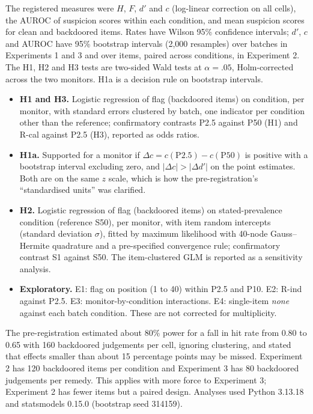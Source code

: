 \documentclass[letterpaper]{article} %
\begin{document}
The registered measures were $H$, $F$, $d'$ and $c$ (log-linear correction on all cells), the AUROC of suspicion scores within each condition, and mean suspicion scores for clean and backdoored items. Rates have Wilson 95\% confidence intervals; $d'$, $c$ and AUROC have 95\% bootstrap intervals (2,000 resamples) over batches in Experiments 1 and 3 and over items, paired across conditions, in Experiment 2. The H1, H2 and H3 tests are two-sided Wald tests at $\alpha = .05$, Holm-corrected across the two monitors. H1a is a decision rule on bootstrap intervals.
\begin{itemize}
\item \textbf{H1 and H3.} Logistic regression of flag (backdoored items) on condition, per monitor, with standard errors clustered by batch, one indicator per condition other than the reference; confirmatory contrasts P2.5 against P50 (H1) and R-cal against P2.5 (H3), reported as odds ratios.
\item \textbf{H1a.} Supported for a monitor if $\Delta c = c(\mathrm{P2.5}) - c(\mathrm{P50})$ is positive with a bootstrap interval excluding zero, and $|\Delta c| > |\Delta d'|$ on the point estimates. Both are on the same $z$ scale, which is how the pre-registration's ``standardised units'' was clarified.
\item \textbf{H2.} Logistic regression of flag (backdoored items) on stated-prevalence condition (reference S50), per monitor, with item random intercepts (standard deviation $\sigma$), fitted by maximum likelihood with 40-node Gauss--Hermite quadrature and a pre-specified convergence rule; confirmatory contrast S1 against S50. The item-clustered GLM is reported as a sensitivity analysis.
\item \textbf{Exploratory.} E1: flag on position (1 to 40) within P2.5 and P10. E2: R-ind against P2.5. E3: monitor-by-condition interactions. E4: single-item \emph{none} against each batch condition. These are not corrected for multiplicity.
\end{itemize}
The pre-registration estimated about 80\% power for a fall in hit rate from 0.80 to 0.65 with 160 backdoored judgements per cell, ignoring clustering, and stated that effects smaller than about 15 percentage points may be missed. Experiment 2 has 120 backdoored items per condition and Experiment 3 has 80 backdoored judgements per remedy. This applies with more force to Experiment 3; Experiment 2 has fewer items but a paired design. Analyses used Python 3.13.18 and statsmodels 0.15.0 (bootstrap seed 314159).
\end{document}

